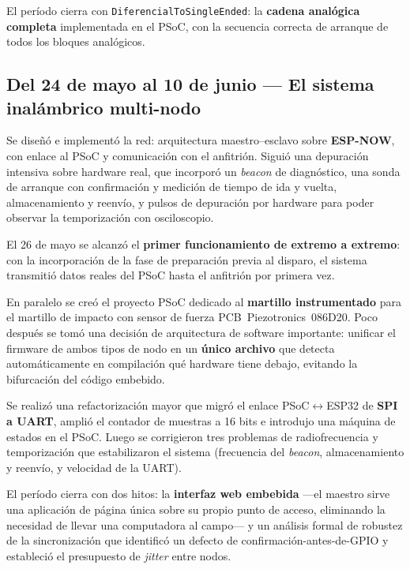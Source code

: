 El per\'iodo cierra con \texttt{DiferencialToSingleEnded}: la \textbf{cadena anal\'ogica
completa} implementada en el PSoC, con la secuencia correcta de arranque de todos los
bloques anal\'ogicos.

\subsection{Del 24 de mayo al 10 de junio --- El sistema inal\'ambrico multi-nodo}

Se dise\~n\'o e implement\'o la red: arquitectura maestro--esclavo sobre \textbf{ESP-NOW},
con enlace al PSoC y comunicaci\'on con el anfitri\'on. Sigui\'o una depuraci\'on intensiva
sobre hardware real, que incorpor\'o un \emph{beacon} de diagn\'ostico, una sonda de arranque
con confirmaci\'on y medici\'on de tiempo de ida y vuelta, almacenamiento y reenv\'io, y
pulsos de depuraci\'on por hardware para poder observar la temporizaci\'on con osciloscopio.

El 26 de mayo se alcanz\'o el \textbf{primer funcionamiento de extremo a extremo}: con la
incorporaci\'on de la fase de preparaci\'on previa al disparo, el sistema transmiti\'o datos
reales del PSoC hasta el anfitri\'on por primera vez.

En paralelo se cre\'o el proyecto PSoC dedicado al \textbf{martillo instrumentado} para el
martillo de impacto con sensor de fuerza PCB~Piezotronics~086D20. Poco despu\'es se tom\'o una decisi\'on de arquitectura
de software importante: unificar el firmware de ambos tipos de nodo en un \textbf{\'unico
archivo} que detecta autom\'aticamente en compilaci\'on qu\'e hardware tiene debajo, evitando
la bifurcaci\'on del c\'odigo embebido.

Se realiz\'o una refactorizaci\'on mayor que migr\'o el enlace PSoC$\leftrightarrow$ESP32 de
\textbf{SPI a UART}, ampli\'o el contador de muestras a 16 bits e introdujo una m\'aquina de
estados en el PSoC. Luego se corrigieron tres problemas de radiofrecuencia y
temporizaci\'on que estabilizaron el sistema (frecuencia del \emph{beacon}, almacenamiento
y reenv\'io, y velocidad de la UART).

El per\'iodo cierra con dos hitos: la \textbf{interfaz web embebida} ---el maestro sirve
una aplicaci\'on de p\'agina \'unica sobre su propio punto de acceso, eliminando la necesidad
de llevar una computadora al campo--- y un an\'alisis formal de robustez de la
sincronizaci\'on que identific\'o un defecto de confirmaci\'on-antes-de-GPIO y estableci\'o el
presupuesto de \emph{jitter} entre nodos.

